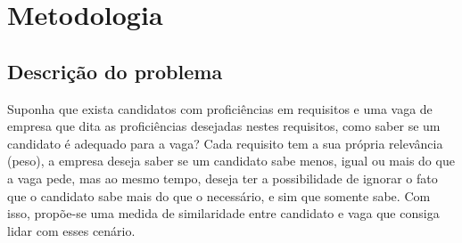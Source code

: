 \documentclass[preprint,12pt]{elsarticle}
\begin{document}


\section{Metodologia}
\label{sec:sample3}

\subsection{Descrição do problema}

Suponha que exista candidatos com proficiências em requisitos e uma vaga de empresa que dita as proficiências desejadas nestes requisitos, como saber se um candidato é adequado para a vaga? Cada requisito tem a sua própria relevância (peso), a empresa deseja saber se um candidato sabe menos, igual ou mais do que a vaga pede, mas ao mesmo tempo, deseja ter a possibilidade de ignorar o fato que o candidato sabe mais do que o necessário, e sim que somente sabe. Com isso, propõe-se uma medida de similaridade entre candidato e vaga que consiga lidar com esses cenário.
\end{document}
